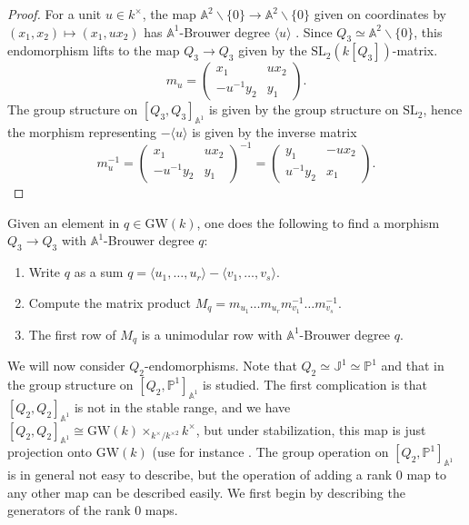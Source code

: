 \documentclass[11pt,leqno]{article}
\newcommand{\A}{{\mathbb A}}
\newcommand{\Proj}{{\mathbb P}}
\newcommand{\pone}{{\mathbb P}^1}
\renewcommand{\1}{{\rm 1\hspace*{-0.4ex}%
\rule{0.1ex}{1.52ex}\hspace*{0.2ex}}}
\newcommand{\<}[1]{{\langle}#1 {\rangle}}
\theoremstyle{plain}
\theoremstyle{definition}
\theoremstyle{remark}
\numberwithin{equation}{section}
\begin{document}
\begin{proof}
    For a unit $u\in k^\times$, the map $\A^2 \smallsetminus \{0\} \to \A^2 \smallsetminus \{0\}$ given on coordinates by $(x_1, x_2) \mapsto (x_1,ux_2)$ has $\A^1$-Brouwer degree $\langle u \rangle $ \cite[Lemma 9]{Kass19}. Since $Q_3 \simeq \A^2 \smallsetminus \{0\}$, this endomorphism lifts to the map $Q_3 \to Q_3$ given by the $\mathrm{SL}_2(k[Q_3])$-matrix. \[
    m_u = \begin{pmatrix}
        x_1 & ux_2\\ -u^{-1}y_2  & y_1
    \end{pmatrix}.
    \]
    The group structure on $[Q_3,Q_3]_{\A^1}$ is given by the group structure on $\mathrm{SL}_2$, hence the morphism representing $-\langle u\rangle $ is given by the inverse matrix 
    \[
   m_u^{-1} =  \begin{pmatrix}
        x_1 & ux_2\\ -u^{-1}y_2  & y_1
    \end{pmatrix}^{-1} =\begin{pmatrix}
        y_1 & -ux_2\\ u^{-1}y_2  & x_1
    \end{pmatrix} .
    \]
\end{proof}
Given an element in $q \in \mathrm{GW}(k)$, one does the following to find a morphism $Q_3 \to Q_3 $ with $\A^1$-Brouwer degree $q$:
\begin{enumerate}
    \item Write $q$ as a sum $q = \langle u_1, \ldots, u_r\rangle - \langle v_1, \ldots, v_s\rangle$. 
    \item Compute the matrix product $M_q = m_{u_1} \ldots m_{u_r} m_{v_1}^{-1} \ldots m_{v_s}^{-1}.$
    \item The first row of $M_q$ is a unimodular row with $\A^1$-Brouwer degree $q.$
\end{enumerate}
We will now consider $Q_2$-endomorphisms. Note that $Q_2 \simeq \mathbb{J}^1\simeq \pone$ and that in \cite{Barth25} the group structure on $[Q_2,\Proj^1]_{\A^1}$ is studied. The first complication is that $[Q_2,Q_2]_{\A^1}$ is not in the stable range, and we have $[Q_2,Q_2]_{\A^1} \cong \mathrm{GW}(k) \times _{k^\times / k^{\times 2}} k^\times$, but under stabilization, this map is just projection onto $\mathrm{GW}(k)$ (use for instance \cite[Theorem 6.37]{Morel08}. The group operation on $[Q_2,\Proj^1]_{\A^1}$ is in general not easy to describe, but the operation of adding a rank $0$ map to any other map can be described easily. We first begin by describing the generators of the rank $0$ maps. 
\end{document}
